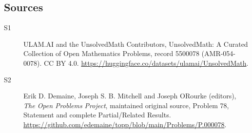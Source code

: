 \documentclass[11pt]{article}
\begin{document}
\subsection{Sources}
\begin{description}
\item[\hypertarget{source:5500078:1}{S1}] ULAM.AI and the UnsolvedMath Contributors, UnsolvedMath: A Curated Collection of Open Mathematics Problems, record 5500078 (AMR-054-0078). CC BY 4.0. \url{https://huggingface.co/datasets/ulamai/UnsolvedMath}.
\item[\hypertarget{source:5500078:2}{S2}] Erik D. Demaine, Joseph S. B. Mitchell and Joseph O\textquotesingle Rourke (editors), \emph{The Open Problems Project}, maintained original source, Problem 78, Statement and complete Partial/Related Results. \url{https://github.com/edemaine/topp/blob/main/Problems/P.000078}.
\end{description}
\label{end:5500078}
\end{document}
